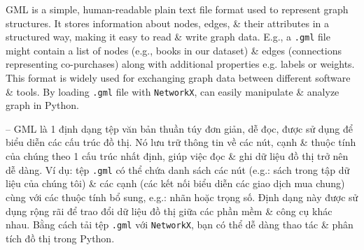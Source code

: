 \documentclass{article}
\begin{document}
\begin{itemize}
\begin{itemize}
\begin{itemize}
           GML is a simple, human-readable plain text file format used to represent graph structures. It stores information about nodes, edges, \& their attributes in a structured way, making it easy to read \& write graph data. E.g., a {\tt.gml} file might contain a list of nodes (e.g., books in our dataset) \& edges (connections representing co-purchases) along with additional properties e.g. labels or weights. This format is widely used for exchanging graph data between different software \& tools. By loading {\tt.gml} file with {\tt NetworkX}, can easily manipulate \& analyze graph in Python.

           -- GML là 1 định dạng tệp văn bản thuần túy đơn giản, dễ đọc, được sử dụng để biểu diễn các cấu trúc đồ thị. Nó lưu trữ thông tin về các nút, cạnh \& thuộc tính của chúng theo 1 cấu trúc nhất định, giúp việc đọc \& ghi dữ liệu đồ thị trở nên dễ dàng. Ví dụ: tệp {\tt.gml} có thể chứa danh sách các nút (e.g.: sách trong tập dữ liệu của chúng tôi) \& các cạnh (các kết nối biểu diễn các giao dịch mua chung) cùng với các thuộc tính bổ sung, e.g.: nhãn hoặc trọng số. Định dạng này được sử dụng rộng rãi để trao đổi dữ liệu đồ thị giữa các phần mềm \& công cụ khác nhau. Bằng cách tải tệp {\tt.gml} với {\tt NetworkX}, bạn có thể dễ dàng thao tác \& phân tích đồ thị trong Python.


\end{itemize}
\end{itemize}
\end{itemize}
\end{document}
